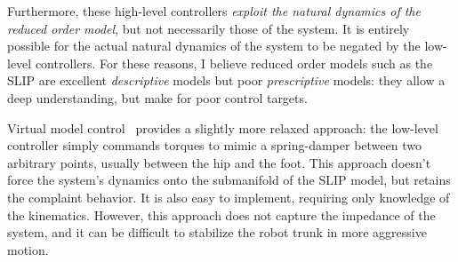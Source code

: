 Furthermore, these high-level controllers \emph{exploit the natural dynamics of the reduced order model}, but not necessarily those of the system. It is entirely possible for the actual natural dynamics of the system to be negated by the low-level controllers.
For these reasons, I believe reduced order models such as the SLIP are excellent \emph{descriptive} models but poor \emph{prescriptive} models: they allow a deep understanding, but make for poor control targets. \par
Virtual model control~\cite{pratt2001virtual,renjewski2015exciting} provides a slightly more relaxed approach: the low-level controller simply commands torques to mimic a spring-damper between two arbitrary points, usually between the hip and the foot. This approach doesn't force the system's dynamics onto the submanifold of the SLIP model, but retains the complaint behavior. It is also easy to implement, requiring only knowledge of the kinematics. However, this approach does not capture the impedance of the system, and it can be difficult to stabilize the robot trunk in more aggressive motion.

